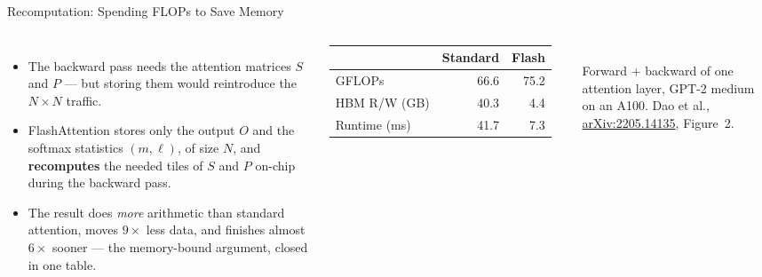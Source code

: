 \begin{frame}{Recomputation: Spending FLOPs to Save Memory}
    \begin{columns}[T,onlytextwidth]
        \begin{itemize}\itemsep0.5em
            \item The backward pass needs the attention matrices $S$ and $P$ --- but storing them would reintroduce the $N \times N$ traffic.
            \item FlashAttention stores only the output $O$ and the softmax statistics $(m, \ell)$, of size $N$, and \textbf{recomputes} the needed tiles of $S$ and $P$ on-chip during the backward pass.
            \item The result does \emph{more} arithmetic than standard attention, moves $9\times$ less data, and finishes almost $6\times$ sooner --- the memory-bound argument, closed in one table.
        \end{itemize}
        \centering
        \vspace{1.5em}
        {\small
        \begin{tabular}{lrr}
            \toprule
            & Standard & Flash \\
            \midrule
            GFLOPs & 66.6 & 75.2 \\
            HBM R/W (GB) & 40.3 & 4.4 \\
            Runtime (ms) & 41.7 & 7.3 \\
            \bottomrule
        \end{tabular}}\\[0.8em]
        {\scriptsize Forward + backward of one attention layer, GPT-2 medium on an A100. Dao et al., \href{https://arxiv.org/abs/2205.14135}{arXiv:2205.14135}, Figure~2.}
    \end{columns}
\end{frame}

